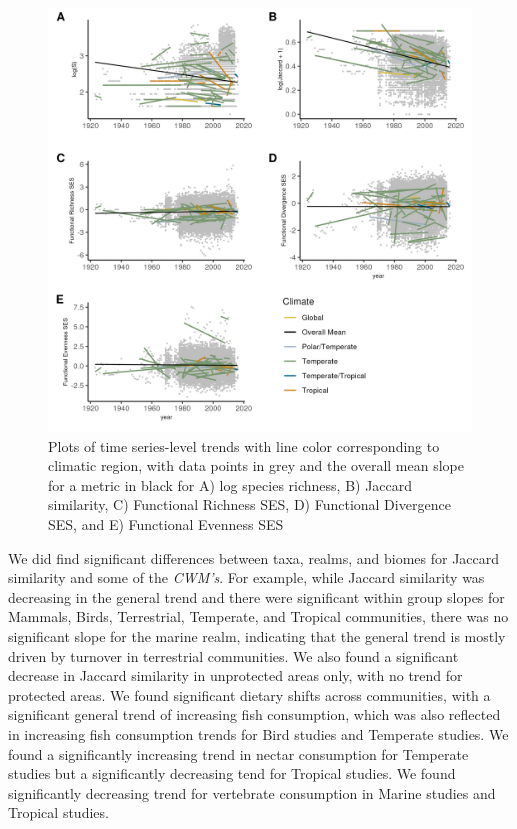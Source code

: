 \documentclass{article}
\begin{document}
\begin{figure}
\includegraphics[width=\textwidth]{../../figures/3met_long} \caption{Plots of time series-level trends with line color corresponding to climatic region, with data points in grey and the overall mean slope for a metric in black for A) log species richness, B) Jaccard similarity, C) Functional Richness SES, D) Functional Divergence SES, and E) Functional Evenness SES}\label{fig:timeseriesPlot}
\end{figure}

We did find significant differences between taxa, realms, and biomes for
Jaccard similarity and some of the \emph{CWM's}. For example, while
Jaccard similarity was decreasing in the general trend and there were
significant within group slopes for Mammals, Birds, Terrestrial,
Temperate, and Tropical communities, there was no significant slope for
the marine realm, indicating that the general trend is mostly driven by
turnover in terrestrial communities. We also found a significant
decrease in Jaccard similarity in unprotected areas only, with no trend
for protected areas. We found significant dietary shifts across
communities, with a significant general trend of increasing fish
consumption, which was also reflected in increasing fish consumption
trends for Bird studies and Temperate studies. We found a significantly
increasing trend in nectar consumption for Temperate studies but a
significantly decreasing tend for Tropical studies. We found
significantly decreasing trend for vertebrate consumption in Marine
studies and Tropical studies.
\end{document}
